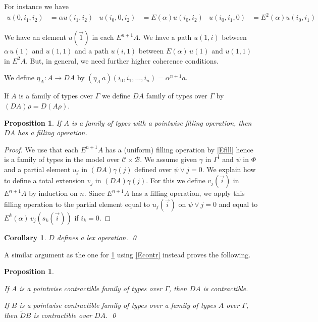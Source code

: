 \documentclass[10pt,a4paper,draft]{article}
\newcommand{\II}{\mathbb{I}}
\newcommand{\CC}{{\mathcal C}}
\newcommand{\BB}{\mathcal{B}}
\newcommand{\D}{D}              %
\newcommand{\DD}{\tilde{D}} %
\newcommand{\E}{E}
\renewcommand{\~}{\widetilde}
\newcommand{\cofunivConst}{\Phi}
\newtheorem{corollary}[theorem]{Corollary}
\newtheorem{proposition}[theorem]{Proposition}
\theoremstyle{definition}
\theoremstyle{remark} %
\begin{document}
For instance we have
\begin{align*}
u(0,i_1,i_2) &= \alpha u(i_1,i_2) &
u(i_0,0,i_2) &= \E(\alpha) u(i_0,i_2) &
u(i_0,i_1,0) &= \E^2(\alpha) u(i_0,i_1)
\end{align*}

We have an element $u(\vec{1})$ in each $\E^{n+1}A$.
We have a path $u(1,i)$ between $\alpha\,u(1)$ and $u(1,1)$
and a path $u(i,1)$ between $\E(\alpha)\,u(1)$ and $u(1,1)$ in $\E^2A$.
But, in general, we need further higher coherence conditions.

\medskip

We define $\eta_A : A\rightarrow \D A$ by $(\eta_A\, a)(i_0,i_1,\dots,i_n) = \alpha^{n+1} a$.

If $A$ is a family of types over $\Gamma$ we define $\D A$ family of types
over $\Gamma$ by $(\D A)\rho = \D(A\rho)$.

\begin{proposition}\label{Dfill}
  If $A$ is a family of types with a pointwise filling operation,
  then $\D A$ has a filling operation.
\end{proposition}

\begin{proof}
  We use that each $\E^{n+1}A$ has a (uniform) filling operation by \cref{Efill}
  hence is a family of types in the model over $\CC\times\BB$.
  We assume given $\gamma$ in $\Gamma^{\II}$ and $\psi$ in $\cofunivConst$ and a partial
  element $u_j$ in $(\D A)\gamma(j)$ defined over $\psi\vee j=0$. We explain
  how to define a total extension $v_j$ in $(\D A)\gamma(j)$.
  For this we define $v_j(\vec{i})$ in $\E^{n+1}A$  by induction on $n$.
  Since $\E^{n+1}A$ has a filling operation, we apply this filling operation
  to the partial element equal to $u_j(\vec{i})$ on $\psi\vee j=0$
  and equal to $\E^k(\alpha)\, {v_j}(s_k(\vec{i}))$ if $i_k = 0$.
\end{proof}


\begin{corollary}\label{Dlex}
  $\D$ defines a lex operation.
\qed
\end{corollary}

A similar argument as the one for \cref{Dfill}
using \cref{Econtr} instead proves the following.

\begin{proposition}\label{Dcontr} \leavevmode
\begin{parts}
\item
If $A$ is a pointwise contractible family of types over $\Gamma$, then $\D A$ is contractible.
\item
If $B$ is a pointwise contractible family of types over a family of types $A$ over $\Gamma$, then $\DD B$ is contractible over $\D A$.
\qed
\end{parts}
\end{proposition}
\end{document}
